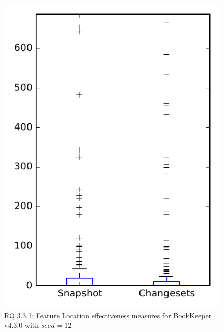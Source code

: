 
\begin{figure}
\centering
\includegraphics[height=0.4\textheight]{figures/flt_seed/rq1_bookkeeper_12}
\caption{RQ 3.3.1: Feature Location effectiveness measures for BookKeeper v4.3.0 with $seed=12$}
\label{fig:flt_seed:rq1:bookkeeper}
\end{figure}
